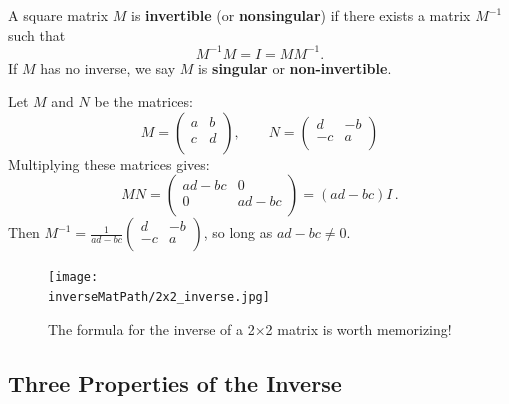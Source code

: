\begin{definition}
A square matrix $M$ is {\bfseries invertible} (or {\bfseries nonsingular}) if there exists a matrix $M^{-1}$ such that
\[
M^{-1}M=I=MM^{-1}.
\]
If $M$ has no inverse, we say $M$ is {\bfseries singular} or {\bfseries non-invertible}.
\end{definition}



\begin{remark} Let $M$ and $N$ be the matrices:
\[
M=\begin{pmatrix}
a & b \\
c & d \\
\end{pmatrix},\qquad N=\begin{pmatrix}
d & -b \\
-c & a \\
\end{pmatrix}
\]
Multiplying these matrices gives:
\[
MN=\begin{pmatrix}
ad-bc & 0 \\
0 & ad-bc \\
\end{pmatrix}=(ad-bc)I\, .
\]
Then $M^{-1}=\frac{1}{ad-bc}\begin{pmatrix}
d & -b \\
-c & a \\
\end{pmatrix}$, so long as $ad-bc\neq 0$.    
\end{remark}

\begin{figure}
\begin{center}
\texttt{[image: \\inverseMatPath/2x2\_inverse.jpg]}
\end{center}
\caption{The formula for the inverse of a 2$\times$2 matrix is worth memorizing!}
\end{figure}



\subsection{Three Properties of the Inverse}

